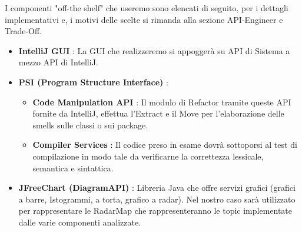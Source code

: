 I componenti "off-the shelf" che useremo sono elencati di seguito, per i dettagli implementativi e, i motivi delle scelte si rimanda alla sezione API-Engineer e Trade-Off.
\\
\begin{itemize}
\item \textbf{IntelliJ GUI} : La GUI che realizzeremo si appoggerà su API di Sistema a mezzo API di IntelliJ.
\item \textbf{PSI (Program Structure Interface)} :
\begin{itemize} 
	\item \textbf{Code Manipulation API} : Il modulo di Refactor tramite queste API fornite da IntelliJ, effettua l'Extract e il Move per l'elaborazione delle smells sulle classi o sui package.
	\item \textbf{Compiler Services} : Il codice preso in esame dovrà sottoporsi al test di compilazione in modo tale da verificarne la correttezza lessicale, semantica e sintattica.
\end{itemize}

\item \textbf{JFreeChart (DiagramAPI)} : Libreria Java che offre servizi grafici (grafici a barre, Istogrammi,  a torta, grafico a radar). Nel nostro caso sarà utilizzato per rappresentare le RadarMap che rappresenteranno le topic implementate dalle varie componenti analizzate.
\end{itemize}